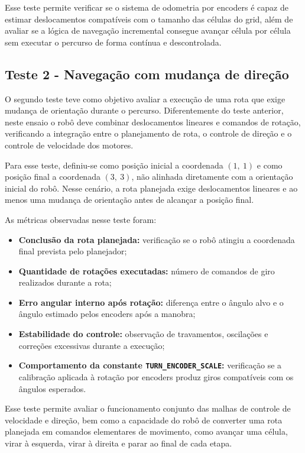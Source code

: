 \documentclass[	12pt, Times, openright, twoside, a4paper, english, brazil]{abntex2}
\begin{document}
Esse teste permite verificar se o sistema de odometria por encoders é capaz de estimar deslocamentos compatíveis com o tamanho das células do grid, além de avaliar se a lógica de navegação incremental consegue avançar célula por célula sem executar o percurso de forma contínua e descontrolada.

\subsection*{Teste 2 - Navegação com mudança de direção}
\label{sec:teste_mudanca_direcao}

O segundo teste teve como objetivo avaliar a execução de uma rota que exige mudança de orientação durante o percurso. Diferentemente do teste anterior, neste ensaio o robô deve combinar deslocamentos lineares e comandos de rotação, verificando a integração entre o planejamento de rota, o controle de direção e o controle de velocidade dos motores.

Para esse teste, definiu-se como posição inicial a coordenada $(1,\ 1)$ e como posição final a coordenada $(3,\ 3)$, não alinhada diretamente com a orientação inicial do robô. Nesse cenário, a rota planejada exige deslocamentos lineares e ao menos uma mudança de orientação antes de alcançar a posição final.

As métricas observadas nesse teste foram:

\begin{itemize}
	\item \textbf{Conclusão da rota planejada:} verificação se o robô atingiu a coordenada final prevista pelo planejador;
	\item \textbf{Quantidade de rotações executadas:} número de comandos de giro realizados durante a rota;
	\item \textbf{Erro angular interno após rotação:} diferença entre o ângulo alvo e o ângulo estimado pelos encoders após a manobra;
	\item \textbf{Estabilidade do controle:} observação de travamentos, oscilações e correções excessivas durante a execução;
	\item \textbf{Comportamento da constante \texttt{TURN\_ENCODER\_SCALE}:} verificação se a calibração aplicada à rotação por encoders produz giros compatíveis com os ângulos esperados.
\end{itemize}

Esse teste permite avaliar o funcionamento conjunto das malhas de controle de velocidade e direção, bem como a capacidade do robô de converter uma rota planejada em comandos elementares de movimento, como avançar uma célula, virar à esquerda, virar à direita e parar ao final de cada etapa.
\end{document}
